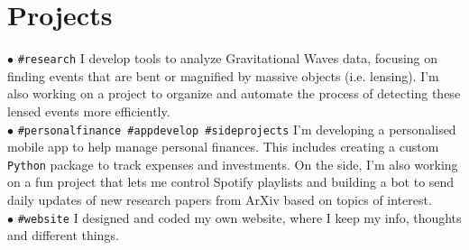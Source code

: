 \documentclass[letterpaper]{twentysecondcv} %
\begin{document}

\section{Projects}

\iffalse
\begin{twentymedium} %
    \twentyitemmedium{research}{PostDoc Researcher \dots .}{}{}
    \twentyitemmedium{website}{I created \dots .}{}{}
    \twentyitemmedium{app}{I am developing.}{}{}
    \twentyitemmedium{personal\\finance}{I created a package \dots .}{}{}
\end{twentymedium}
\fi

$\bullet$ \texttt{\#research}  
          {\small 
          I develop tools to analyze Gravitational Waves data, focusing on finding events that are bent or magnified by massive objects (i.e. lensing). I’m also working on a project to organize and automate the process of detecting these lensed events more efficiently.
          }\\ 
$\bullet$ \texttt{\#personalfinance \#appdevelop \#sideprojects}
          {\small 
          I'm developing a personalised mobile app to help manage personal finances. This includes creating a custom \texttt{Python} package to track expenses and investments. On the side, I'm also working on a fun project that lets me control Spotify playlists and building a bot to send daily updates of new research papers from ArXiv based on topics of interest.
          }\\
$\bullet$ \texttt{\#website}   
          {\small I designed and coded my own website, where I keep my info, thoughts and different things.}



% 
\end{document}
